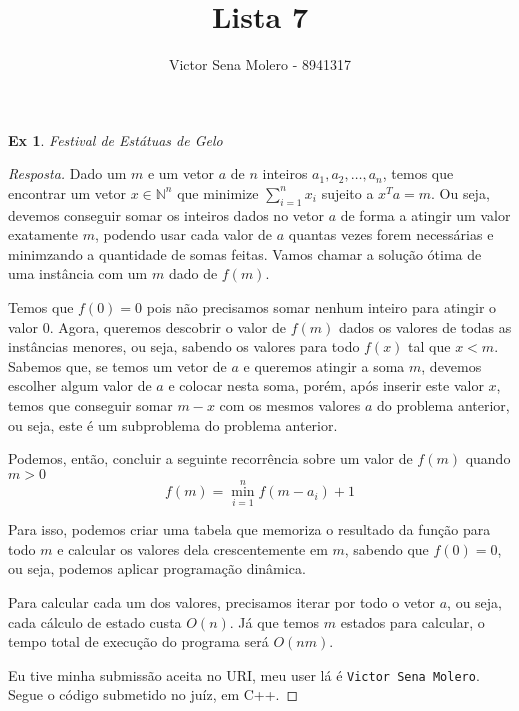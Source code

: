 \documentclass[12pt]{article}
\newcounter{exCounter}
\newtheorem{ex}[exCounter]{Ex}
\begin{document}
 
 
\title{Lista 7}
\author{Victor Sena Molero - 8941317}
\maketitle

\begin{ex}
Festival de Estátuas de Gelo
\end{ex}

\begin{proof}[Resposta]
Dado um $m$ e um vetor $a$ de $n$ inteiros $a_1, a_2, \dots, a_n$, temos que encontrar um vetor $x \in \mathbb{N}^n$ que minimize $\sum\limits_{i=1}^n x_i$ sujeito a $x^Ta = m$. Ou seja, devemos conseguir somar os inteiros dados no vetor $a$ de forma a atingir um valor exatamente $m$, podendo usar cada valor de $a$ quantas vezes forem necessárias e minimzando a quantidade de somas feitas. Vamos chamar a solução ótima de uma instância com um $m$ dado de $f(m)$.

Temos que $f(0) = 0$ pois não precisamos somar nenhum inteiro para atingir o valor 0. Agora, queremos descobrir o valor de $f(m)$ dados os valores de todas as instâncias menores, ou seja, sabendo os valores para todo $f(x)$ tal que $x < m$. Sabemos que, se temos um vetor de $a$ e queremos atingir a soma $m$, devemos escolher algum valor de $a$ e colocar nesta soma, porém, após inserir este valor $x$, temos que conseguir somar $m-x$ com os mesmos valores $a$ do problema anterior, ou seja, este é um subproblema do problema anterior. 

Podemos, então, concluir a seguinte recorrência sobre um valor de $f(m)$ quando $m > 0$
$$ f(m) = \min\limits_{i=1}^{n} f(m-a_i)+1 $$

Para isso, podemos criar uma tabela que memoriza o resultado da função para todo $m$ e calcular os valores dela crescentemente em $m$, sabendo que $f(0) = 0$, ou seja, podemos aplicar programação dinâmica.

Para calcular cada um dos valores, precisamos iterar por todo o vetor $a$, ou seja, cada cálculo de estado custa $O(n)$. Já que temos $m$ estados para calcular, o tempo total de execução do programa será $O(nm)$.

Eu tive minha submissão aceita no URI, meu user lá é \texttt{Victor Sena Molero}. Segue o código submetido no juíz, em C++.
\end{proof}
\end{document}
